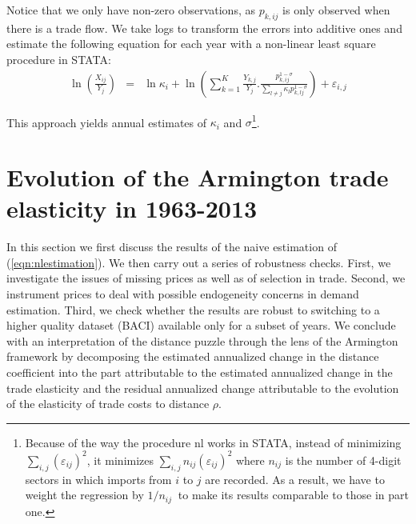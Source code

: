 \documentclass[12pt,twoside,a4paper,notitlepage]{article}
\begin{document}
Notice that we only have non-zero observations, as ${{p}_{k,ij}}$ is only observed when there is a trade flow.
We take logs to transform the errors into additive ones and estimate the following equation for each year with a non-linear least square procedure in STATA:
\begin{eqnarray}
   \ln \left( \frac{{{X}_{ij}}}{{{Y}_{j}}} \right) & = & \ln {{\kappa }_{i}} +\ln \left( \sum\limits_{k=1}^{K}{\frac{{{Y}_{k,j}}}{{{Y}_{j}}}.}\frac{p_{k,ij}^{1-\sigma }}{\sum\limits_{l\ne j}{{{\kappa }_{l}}}p_{k,lj}^{1-\sigma }} \right) +{{\varepsilon }_{i,j}}
   \label{eqn:nlestimation}
   \end{eqnarray}
   
This approach yields annual estimates of ${{\kappa }_{i}}$ and $\sigma $\footnote{Because of the way the procedure nl works in STATA, instead of minimizing $\sum\limits_{i,j}{{{\left( {{\varepsilon }_{ij}} \right)}^{2}}}$, it minimizes $\sum\limits_{i,j}{{{n}_{ij}}{{\left( {{\varepsilon }_{ij}} \right)}^{2}}}$ where ${{n}_{ij}}$ is the number of 4-digit sectors in which imports from $i$ to $j$ are recorded.
As a result, we have to weight the regression by $1/{{n}_{ij}}\ $ to make its results comparable to those in part one.
}.


\section{ \label{ref-003}Evolution of the Armington trade elasticity in 1963-2013\label{mark-2.}}

In this section we first discuss the results of the naive estimation of (\ref{eqn:nlestimation}). 
We then carry out a series of robustness checks. 
First, we investigate the issues of missing prices as well as of selection in trade. 
Second, we instrument prices to deal with possible endogeneity concerns in demand estimation.   
Third, we check whether the results are robust to switching to a higher quality dataset (BACI) available only for a subset of years.
We conclude with an interpretation of the distance puzzle through the lens of the Armington framework by decomposing the estimated annualized change in the distance coefficient into the part attributable to the estimated annualized change in the trade elasticity and the residual annualized change attributable to the evolution of the elasticity of trade costs to distance $ \rho $. 
\end{document}
